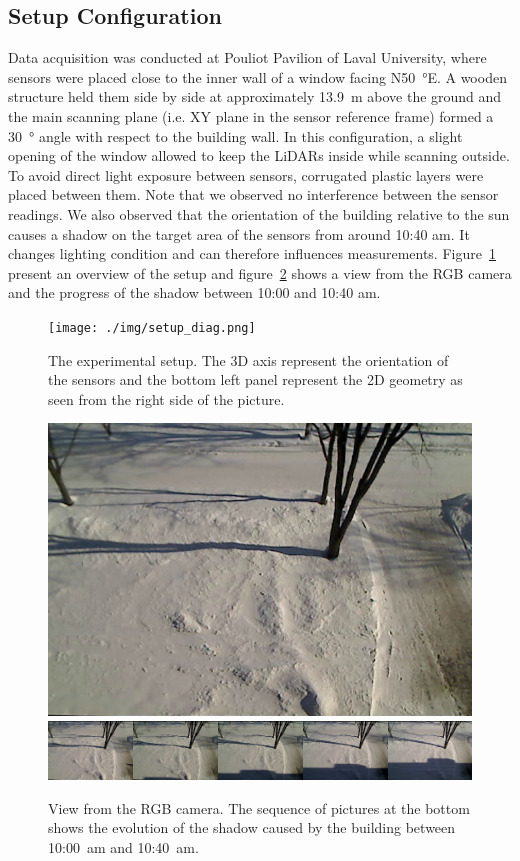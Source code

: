 \subsection{Setup Configuration}
Data acquisition was conducted at Pouliot Pavilion of Laval University, where sensors were placed close to the inner wall of a window facing N\SI{50}{\degree}E. A wooden structure held them side by side at approximately \SI{13.9}{\meter} above the ground and the main scanning plane (i.e. XY plane in the sensor reference frame) formed a \SI{30}{\degree} angle with respect to the building wall. In this configuration, a slight opening of the window allowed to keep the LiDARs inside while scanning outside. To avoid direct light exposure between sensors, corrugated plastic layers were placed between them. Note that we observed no interference between the sensor readings. We also observed that the orientation of the building relative to the sun causes a shadow on the target area of the sensors from around 10:40 am. It changes lighting condition and can therefore influences measurements. Figure~\ref{fig:setup} present an overview of the setup and figure~\ref{fig:view} shows a view from the RGB camera and the progress of the shadow between 10:00 and 10:40 am.

\begin{figure}[h]
    \centering
    \texttt{[image: ./img/setup\_diag.png]}
    \caption{The experimental setup. The 3D axis represent the orientation of the sensors and the bottom left panel represent the 2D geometry as seen from the right side of the picture.}
    \label{fig:setup}
\end{figure}
\begin{figure}[h]
    \centering
    \includegraphics[width=0.90\linewidth]{./img/camera_view.jpg}
    \includegraphics[width=0.95\linewidth]{./img/shadow2.png}
    \caption{View from the RGB camera. The sequence of pictures at the bottom shows the evolution of the shadow caused by the building between 10:00~am and 10:40~am.}
    \label{fig:view}
\end{figure}

